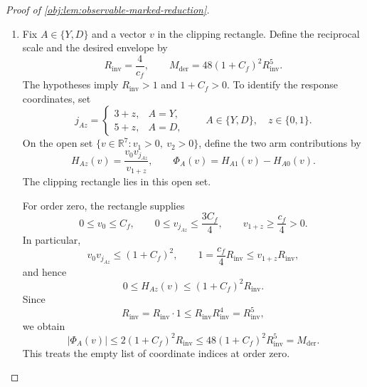 \begin{proof}[Proof of \cref{obj:lem:observable-marked-reduction}]
\begin{enumerate}
\item Fix \(A\in\{Y,D\}\) and a vector \(v\) in the clipping rectangle. Define the reciprocal scale and the desired envelope by
\[
R_{\mathrm{inv}}=\frac4{c_f},
\qquad
M_{\mathrm{der}}=48(1+C_f)^2R_{\mathrm{inv}}^5.
\]
The hypotheses imply \(R_{\mathrm{inv}}>1\) and \(1+C_f>0\). To identify the response coordinates, set
\[
j_{Az}=
\begin{cases}
3+z,&A=Y,\\
5+z,&A=D,
\end{cases}
\qquad A\in\{Y,D\},\quad z\in\{0,1\}.
\]
On the open set \(\{v\in\mathbb R^7:v_1>0,\ v_2>0\}\), define the two arm contributions by
\[
H_{Az}(v)=\frac{v_0v_{j_{Az}}}{v_{1+z}},
\qquad
\Phi_A(v)=H_{A1}(v)-H_{A0}(v).
\]
The clipping rectangle lies in this open set.

For order zero, the rectangle supplies
\[
0\le v_0\le C_f,\qquad
0\le v_{j_{Az}}\le\frac{3C_f}{4},\qquad
v_{1+z}\ge\frac{c_f}{4}>0.
\]
In particular,
\[
v_0v_{j_{Az}}\le(1+C_f)^2,
\qquad
1=\frac{c_f}{4}R_{\mathrm{inv}}
\le v_{1+z}R_{\mathrm{inv}},
\]
and hence
\[
0\le H_{Az}(v)\le(1+C_f)^2R_{\mathrm{inv}}.
\]
Since
\[
R_{\mathrm{inv}}
=R_{\mathrm{inv}}\cdot1
\le R_{\mathrm{inv}}R_{\mathrm{inv}}^4
=R_{\mathrm{inv}}^5,
\]
we obtain
\[
|\Phi_A(v)|
\le 2(1+C_f)^2R_{\mathrm{inv}}
\le48(1+C_f)^2R_{\mathrm{inv}}^5
=M_{\mathrm{der}}.
\]
This treats the empty list of coordinate indices at order zero.


\end{enumerate}
\end{proof}
